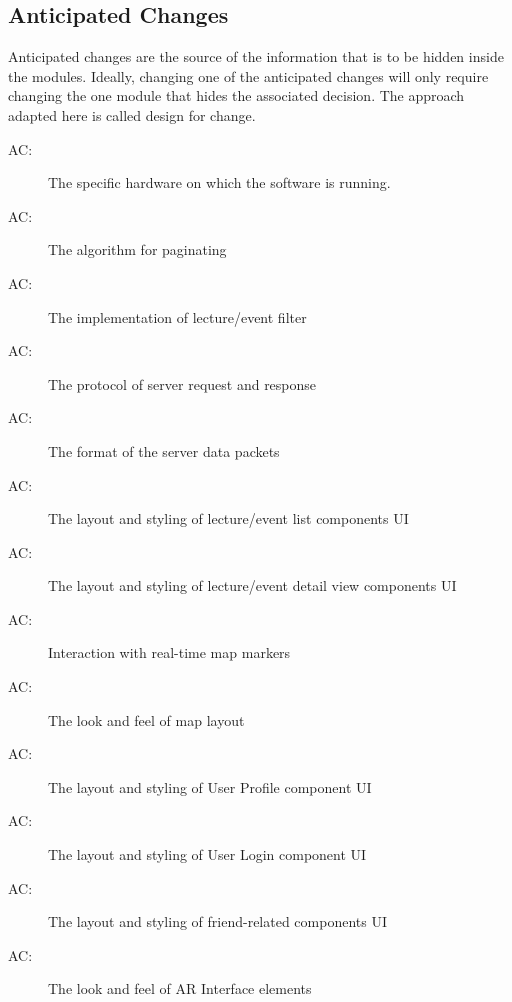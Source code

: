 \documentclass[12pt, titlepage]{article}
\newcounter{acnum}
\newcommand{\actheacnum}{AC\theacnum}
\begin{document}
\subsection{Anticipated Changes} \label{SecAchange}

Anticipated changes are the source of the information that is to be hidden
inside the modules. Ideally, changing one of the anticipated changes will only
require changing the one module that hides the associated decision. The approach
adapted here is called design for
change.

\begin{description}
\item[ \actheacnum \label{acHardware}:] The specific
  hardware on which the software is running.
\item[ \actheacnum \label{acPaginate}:] The algorithm for paginating
\item[ \actheacnum \label{acFilter}:] The implementation of lecture/event filter
\item[ \actheacnum \label{acProtocol}:] The protocol of server request and response
\item[ \actheacnum \label{acServerData}:] The format of the server data packets
\item[ \actheacnum \label{acListUI}:] The layout and styling of lecture/event list components UI
\item[ \actheacnum \label{acDetailViewUI}:] The layout and styling of lecture/event detail view components UI
\item[ \actheacnum \label{acMapInteract}:] Interaction with real-time map markers
\item[ \actheacnum \label{acMapLayout}:] The look and feel of map layout
\item[ \actheacnum \label{acUserUI}:] The layout and styling of User Profile component UI
\item[ \actheacnum \label{acLoginUI}:] The layout and styling of User Login component UI
\item[ \actheacnum \label{acFriendUI}:] The layout and styling of friend-related components UI
\item[ \actheacnum \label{acARUI}:] The look and feel of AR Interface elements
\end{description}
\end{document}
